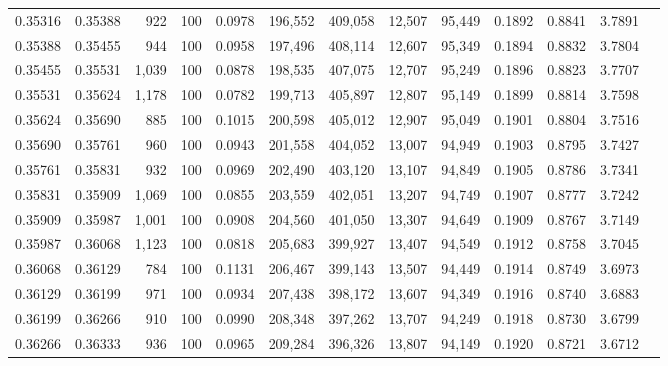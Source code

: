 \begin{tabular}{rrrrrrrrrrrrr}
0.35316 & 0.35388 &   922 & 100 &                                     0.0978 & 196,552 & 409,058 &  12,507 &  95,449 & 0.1892 & 0.8841 & 3.7891 \\
0.35388 & 0.35455 &   944 & 100 &                                     0.0958 & 197,496 & 408,114 &  12,607 &  95,349 & 0.1894 & 0.8832 & 3.7804 \\
0.35455 & 0.35531 & 1,039 & 100 &                                     0.0878 & 198,535 & 407,075 &  12,707 &  95,249 & 0.1896 & 0.8823 & 3.7707 \\
0.35531 & 0.35624 & 1,178 & 100 &                                     0.0782 & 199,713 & 405,897 &  12,807 &  95,149 & 0.1899 & 0.8814 & 3.7598 \\
0.35624 & 0.35690 &   885 & 100 &                                     0.1015 & 200,598 & 405,012 &  12,907 &  95,049 & 0.1901 & 0.8804 & 3.7516 \\
0.35690 & 0.35761 &   960 & 100 &                                     0.0943 & 201,558 & 404,052 &  13,007 &  94,949 & 0.1903 & 0.8795 & 3.7427 \\
0.35761 & 0.35831 &   932 & 100 &                                     0.0969 & 202,490 & 403,120 &  13,107 &  94,849 & 0.1905 & 0.8786 & 3.7341 \\
0.35831 & 0.35909 & 1,069 & 100 &                                     0.0855 & 203,559 & 402,051 &  13,207 &  94,749 & 0.1907 & 0.8777 & 3.7242 \\
0.35909 & 0.35987 & 1,001 & 100 &                                     0.0908 & 204,560 & 401,050 &  13,307 &  94,649 & 0.1909 & 0.8767 & 3.7149 \\
0.35987 & 0.36068 & 1,123 & 100 &                                     0.0818 & 205,683 & 399,927 &  13,407 &  94,549 & 0.1912 & 0.8758 & 3.7045 \\
0.36068 & 0.36129 &   784 & 100 &                                     0.1131 & 206,467 & 399,143 &  13,507 &  94,449 & 0.1914 & 0.8749 & 3.6973 \\
0.36129 & 0.36199 &   971 & 100 &                                     0.0934 & 207,438 & 398,172 &  13,607 &  94,349 & 0.1916 & 0.8740 & 3.6883 \\
0.36199 & 0.36266 &   910 & 100 &                                     0.0990 & 208,348 & 397,262 &  13,707 &  94,249 & 0.1918 & 0.8730 & 3.6799 \\
0.36266 & 0.36333 &   936 & 100 &                                     0.0965 & 209,284 & 396,326 &  13,807 &  94,149 & 0.1920 & 0.8721 & 3.6712 \\

\end{tabular}
